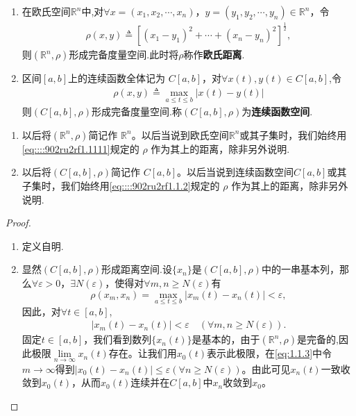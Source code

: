 \documentclass[../../main.tex]{subfiles}%
\begin{document}
\begin{theorem}[常见的度量空间]\label{theorem:常见的度量空间}
\begin{enumerate}
\item 在欧氏空间$\mathbb{R}^n$中,对$\forall x=(x_1,x_2,\cdots,x_n)$，$y=(y_1,y_2,\cdots,y_n)\in \mathbb{R}^n$，令
\begin{align}\label{eq::::902ru2rf1.1111}
\rho(x,y)\triangleq\left[(x_1 - y_1)^2 + \cdots + (x_n - y_n)^2\right]^{\frac{1}{2}},
\end{align}
则$(\mathbb{R}^n,\rho)$形成完备度量空间.此时将$\rho$称作\textbf{欧氏距离}.

\item 区间$[a,b]$上的连续函数全体记为 $C[a,b]$，对$\forall x(t),y(t)\in C[a,b]$,令
\begin{align}
\label{eq::::902ru2rf1.1.2}
\rho(x,y) \triangleq \max_{a \leqslant t \leqslant b} |x(t) - y(t)|
\end{align}
则$(C[a,b],\rho)$形成完备度量空间.称$(C[a,b],\rho)$为\textbf{连续函数空间}.
\end{enumerate}
\end{theorem}
\begin{remark}
\begin{enumerate}
\item 以后将$(\mathbb{R}^n,\rho)$简记作 $\mathbb{R}^n$。以后当说到欧氏空间$\mathbb{R}^n$或其子集时，我们始终用\eqref{eq::::902ru2rf1.1111}规定的 $\rho$ 作为其上的距离，除非另外说明.

\item 以后将$(C[a,b],\rho)$简记作 $C[a,b]$。以后当说到连续函数空间$C[a,b]$或其子集时，我们始终用\eqref{eq::::902ru2rf1.1.2}规定的 $\rho$ 作为其上的距离，除非另外说明.
\end{enumerate}
\end{remark}
\begin{proof}
\begin{enumerate}
\item 定义自明.

\item 显然$(C[a,b],\rho)$形成距离空间.设$\{x_n\}$是$(C[a,b],\rho)$中的一串基本列，那么$\forall \varepsilon>0$，$\exists N(\varepsilon)$，使得对$\forall m,n\geqslant N(\varepsilon)$有
$$\rho(x_m,x_n)=\max_{a\leqslant t\leqslant b}|x_m(t)-x_n(t)|<\varepsilon,$$
因此，对$\forall t\in [a,b]$,
\begin{align}
\label{eq:1.1.3}
|x_m(t)-x_n(t)|<\varepsilon \quad (\forall m,n\geqslant N(\varepsilon)).
\end{align}
固定$t\in [a,b]$，我们看到数列$\{x_n(t)\}$是基本的，由于$(\mathbb{R}^n,\rho)$是完备的,因此极限$\lim\limits_{n\to \infty} x_n(t)$存在。让我们用$x_0(t)$表示此极限，在\eqref{eq:1.1.3}中令$m\to \infty$得到$|x_0(t)-x_n(t)|\leqslant \varepsilon (\forall n\geqslant N(\varepsilon))$。由此可见$x_n(t)$一致收敛到$x_0(t)$，从而$x_0(t)$连续并在$C[a,b]$中$x_n$收敛到$x_0$。
\end{enumerate}
\end{proof}
\end{document}
